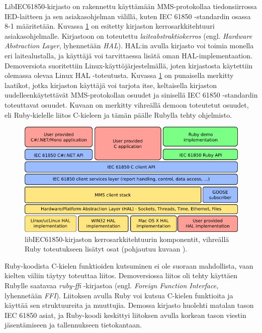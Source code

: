 LibIEC61850-kirjasto on rakennettu käyttämään MMS-protokollaa tiedonsiirrossa IED-laitteen ja sen asiakasohjelman välillä, kuten IEC 61850 -standardin osassa 8-1 määritetään. Kuvassa \ref{fig:libiec61850-layer-architecture} on esitetty kirjaston kerrosarkkitehtuuri asiakasohjelmalle. Kirjastoon on toteutettu \emph{laiteabstraktiokerros} (engl. \emph{Hardware Abstraction Layer}, lyhennetään \emph{HAL}). HAL:in avulla kirjasto voi toimia monella eri laitealustalla, ja käyttäjä voi tarvittaessa lisätä oman HAL-implementaation. Demoversiota suoritettiin Linux-käyttöjärjestelmällä, joten kirjastosta käytettiin olemassa olevaa Linux HAL -toteutusta. Kuvassa \ref{fig:libiec61850-layer-architecture} on punaisella merkitty laatikot, jotka kirjaston käyttäjä voi tarjota itse, keltaisella kirjaston uudelleenkäytettävät MMS-protokollan osuudet ja sinisellä IEC 61850 -standardin toteuttavat osuudet. Kuvaan on merkitty vihreällä demoon toteutetut osuudet, eli Ruby-kielelle liitos C-kieleen ja tämän päälle Rubylla tehty ohjelmisto.

\begin{figure}[ht!]
	\includegraphics[width=1\textwidth]{pictures/libiec61850-layer-architecture.png}
	\caption{libIEC61850-kirjaston kerrosarkkitehtuurin komponentit, vihreällä Ruby toteutukseen lisätyt osat (pohjautuu kuvaan \mbox{\cite{libIEC61850-api-overview}}).}
	\label{fig:libiec61850-layer-architecture}
\end{figure}

Ruby-koodista C-kielen funktioiden kutsuminen ei ole suoraan mahdollista, vaan kielten väliin täytyy toteuttaa liitos. Demoversiossa liitos oli tehty käyttäen Rubylle saatavaa \emph{ruby-ffi} -kirjastoa \cite{ruby-ffi-repo} (engl. \emph{Foreign Function Interface}, lyhennetään \emph{FFI}). Liitoksen avulla Ruby voi kutsua C-kielen funktioita ja käyttää sen struktuureita ja muuttujia. Demossa kirjasto huolehti matalan tason IEC 61850 asiat, ja Ruby-koodi keskittyi liitoksen avulla korkean tason viestin jäsentämiseen ja tallennukseen tietokantaan.



